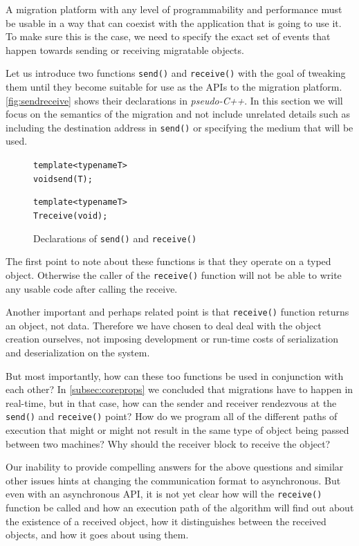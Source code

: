 A migration platform with any level of programmability and performance
must be usable in a way that can coexist with the application that is
going to use it. To make sure this is the case, we need to specify the
exact set of events that happen towards sending or receiving migratable
objects.

Let us introduce two functions \texttt{send()} and \texttt{receive()} with
the goal of tweaking them until they become suitable for use as the APIs
to the migration platform. \autoref{fig:sendreceive} shows their
declarations in \emph{pseudo-C++}. In this section we will focus on
the semantics of the migration and not include unrelated details such as
including the destination address in \texttt{send()} or specifying
the medium that will be used.



\begin{figure}[t]
\begin{alltt}

template<typename T>
void send(T);

template<typename T>
T receive(void);

\end{alltt}
\caption{
    Declarations of \texttt{send()} and \texttt{receive()}
}
\label{fig:sendreceive}
\end{figure}



The first point to note about these functions is that they operate on
a typed object. Otherwise the caller of the \texttt{receive()} function
will not be able to write any usable code after calling the receive.

Another important and perhaps related point is that \texttt{receive()}
function returns an object, not data. Therefore we have chosen to deal
deal with the object creation ourselves, not imposing development or
run-time costs of serialization and deserialization on the system.

But most importantly, how can these too functions be used in conjunction
with each other? In \autoref{subsec:coreprops} we concluded that
migrations have to happen in real-time, but in that case, how can the
sender and receiver rendezvous at the \texttt{send()} and
\texttt{receive()} point? How do we program all of the different paths of
execution that might or might not result in the same type of object being
passed between two machines? Why should the receiver block to receive the
object?

Our inability to provide compelling answers for the above questions
and similar other issues hints
at changing the communication format to asynchronous. But even with an
asynchronous API, it is not yet clear how will the \texttt{receive()}
function be called and how an execution path of the algorithm will find
out about the existence of a received object, how it distinguishes between
the received objects, and how it goes about using them.

